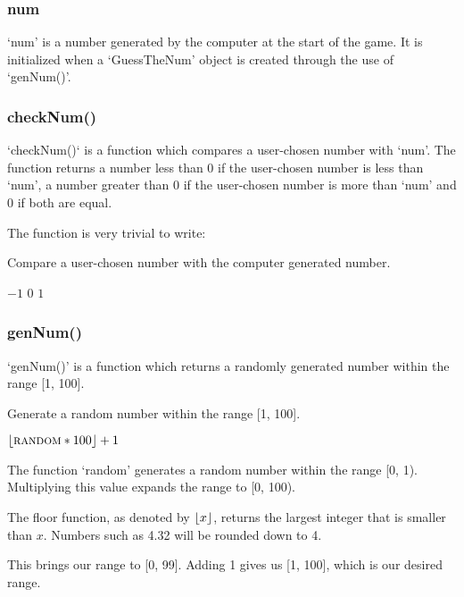 \documentclass{article}
\DeclarePairedDelimiter{\floor}{\lfloor}{\rfloor}
\begin{document}
\subsubsection{num}

`num' is a number generated by the computer at the start of the game. It is initialized when a `GuessTheNum' object is created through the use of `genNum()'.

\subsubsection{checkNum()}

`checkNum()` is a function which compares a user-chosen number with `num'. The function returns a number less than 0 if the user-chosen number is less than `num', a number greater than 0 if the user-chosen number is more than `num' and 0 if both are equal.

The function is very trivial to write:

\begin{algorithm}
\caption{Compare a user-chosen number with the computer generated number.}

\begin{algorithmic}[1]
    \Return $-1$
    \Return $0$
    \Return $1$
  \EndIf
\EndProcedure
\end{algorithmic}
\end{algorithm}

\subsubsection{genNum()}

`genNum()' is a function which returns a randomly generated number within the range [1, 100].

\begin{algorithm}
\caption{Generate a random number within the range [1, 100].}

\begin{algorithmic}[1]
  \Return $\floor{\Call{random}{} * 100} + 1$
\EndProcedure
\end{algorithmic}
\end{algorithm}

The function `random' generates a random number within the range [0, 1). Multiplying this value expands the range to [0, 100).

The floor function, as denoted by $\floor{x}$, returns the largest integer that is smaller than $x$. Numbers such as 4.32 will be rounded down to 4.

This brings our range to [0, 99]. Adding 1 gives us [1, 100], which is our desired range.
\end{document}
